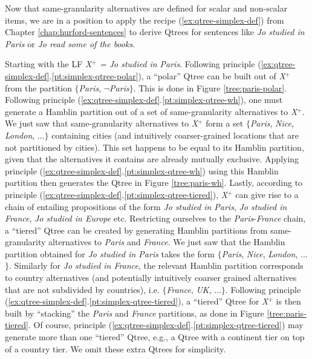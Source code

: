 	Now that same-granularity alternatives are defined for scalar and non-scalar items, we are in a position to apply the recipe (\ref{ex:qtree-simplex-def}) from Chapter \ref{chap:hurford-sentences} to derive Qtrees for sentences like \textit{Jo studied in Paris} or \textit{Jo read some of the books}.
	
	Starting with the LF \textit{X$^+$ = Jo studied in Paris}. Following principle (\ref{ex:qtree-simplex-def}.\ref{pt:simplex-qtree-polar}), a ``polar'' Qtree can be built out of \textit{X}$^+$ from the partition $\lbrace$\textit{Paris}, $\neg$\textit{Paris}$\rbrace$. This is done in Figure \ref{tree:paris-polar}. Following principle (\ref{ex:qtree-simplex-def}.\ref{pt:simplex-qtree-wh}), one must generate a Hamblin partition out of a set of same-granularity alternatives to \textit{X}$^+$. We just saw that same-granularity alternatives to \textit{X}$^+$ form a set $\lbrace$\textit{Paris}, \textit{Nice}, \textit{London}, ...$\rbrace$ containing cities (and intuitively coarser-grained locations that are not partitioned by cities). This set happens to be equal to its Hamblin partition, given that the alternatives it contains are already mutually exclusive. Applying principle (\ref{ex:qtree-simplex-def}.\ref{pt:simplex-qtree-wh}) using this Hamblin partition then generates the Qtree in Figure \ref{tree:paris-wh}. Lastly, according to principle (\ref{ex:qtree-simplex-def}.\ref{pt:simplex-qtree-tiered}), \textit{X}$^+$ can give rise to a chain of entailing propositions of the form \textit{Jo studied in Paris}, \textit{Jo studied in France}, \textit{Jo studied in Europe} etc. Restricting ourselves to the \textit{Paris}-\textit{France} chain, a ``tiered'' Qtree can be created by generating Hamblin partitions from same-granularity alternatives to \textit{Paris} and \textit{France}. We just saw that the Hamblin partition obtained for \textit{Jo studied in Paris} takes the form $\lbrace$\textit{Paris}, \textit{Nice}, \textit{London}, ...$\rbrace$. Similarly for \textit{Jo studied in France}, the relevant Hamblin partition corresponds to country alternatives (and potentially intuitively coarser grained alternatives that are not subdivided by countries), i.e. $\lbrace$\textit{France}, \textit{UK}, ...$\rbrace$. Following principle (\ref{ex:qtree-simplex-def}.\ref{pt:simplex-qtree-tiered}), a ``tiered'' Qtree for \textit{X}$^+$ is then built by ``stacking'' the \textit{Paris} and \textit{France} partitions, as done in Figure \ref{tree:paris-tiered}. Of course, principle (\ref{ex:qtree-simplex-def}.\ref{pt:simplex-qtree-tiered}) may generate more than one ``tiered'' Qtree, e.g., a Qtree with a continent tier on top of a country tier. We omit these extra Qtrees for simplicity.
	
